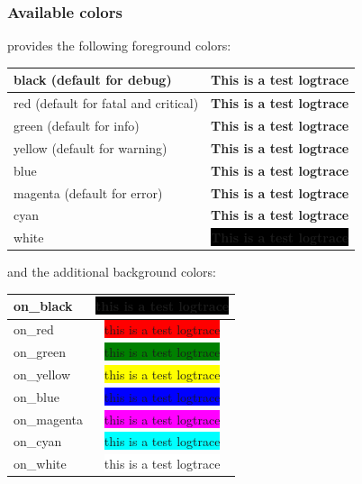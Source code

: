 \subsubsection{Available colors}
\label{sec:availablecolors}
\logftailer{} provides the following foreground colors:

\begin{center}
\begin{tabular}{|l || c|}
\hline
 black (default for debug) & {\color{black} \textbf{This is a test logtrace}} \\ 
\hline
 red (default for fatal and critical) & {\color{red} \textbf{This is a test logtrace}} \\ 
\hline
 green (default for info) & {\color{green} \textbf{This is a test logtrace}} \\ 
\hline
yellow (default for warning) & {\color{yellow} \textbf{This is a test logtrace}} \\ 
\hline
 blue & {\color{blue} \textbf{This is a test logtrace}} \\ 
\hline 
magenta (default for error) & {\color{magenta} \textbf{This is a test logtrace}} \\ 
\hline
 cyan & {\color{cyan} \textbf{This is a test logtrace}} \\ 
\hline 
white & \colorbox{black}{\color{white}\textbf{This is a test logtrace}} \\
\hline
\end{tabular}
\end{center}

and the additional background colors:
\begin{center}
\begin{tabular}{|l | c |}
  \hline
 on\_black & \colorbox{black}{\color{green}this is a test logtrace} \\
 \hline
 on\_red & \colorbox{red}{this is a test logtrace} \\
 \hline
on\_green & \colorbox{green}{this is a test logtrace} \\
 \hline
on\_yellow & \colorbox{yellow}{this is a test logtrace} \\
 \hline
 on\_blue & \colorbox{blue}{this is a test logtrace} \\
 \hline
 on\_magenta & \colorbox{magenta}{this is a test logtrace} \\
 \hline 
on\_cyan & \colorbox{cyan}{this is a test logtrace} \\
 \hline 
on\_white & \colorbox{white}{this is a test logtrace} \\
\hline
\end{tabular}
\end{center}

